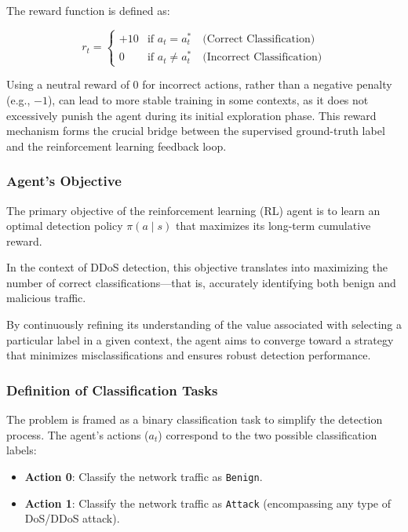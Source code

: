 \documentclass[16pt]{report}
\begin{document}
The reward function is defined as:

\[
r_t =
\begin{cases}
+10 & \text{if } a_t = a_t^* \quad \text{(Correct Classification)} \\
0   & \text{if } a_t \ne a_t^* \quad \text{(Incorrect Classification)}
\end{cases}
\]

Using a neutral reward of 0 for incorrect actions, rather than a negative penalty (e.g., $-1$), can lead to more stable training in some contexts, as it does not excessively punish the agent during its initial exploration phase. This reward mechanism forms the crucial bridge between the supervised ground-truth label and the reinforcement learning feedback loop.

\subsubsection{Agent's Objective}

The primary objective of the reinforcement learning (RL) agent is to learn an optimal detection policy $\pi(a \mid s)$ that maximizes its long-term cumulative reward. 

In the context of DDoS detection, this objective translates into maximizing the number of correct classifications—that is, accurately identifying both benign and malicious traffic. 

By continuously refining its understanding of the value associated with selecting a particular label in a given context, the agent aims to converge toward a strategy that minimizes misclassifications and ensures robust detection performance.

\subsubsection{Definition of Classification Tasks}

The problem is framed as a binary classification task to simplify the detection process. The agent's actions ($a_t$) correspond to the two possible classification labels:

\begin{itemize}
  \item \textbf{Action 0}: Classify the network traffic as \texttt{Benign}.
  \item \textbf{Action 1}: Classify the network traffic as \texttt{Attack} (encompassing any type of DoS/DDoS attack).
\end{itemize}
\end{document}
